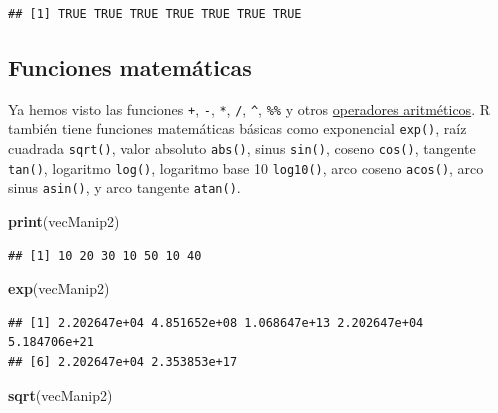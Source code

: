 \documentclass[]{book}
\newenvironment{Shaded}{\begin{snugshade}}{\end{snugshade}}
\newcommand{\KeywordTok}[1]{\textcolor[rgb]{0.13,0.29,0.53}{\textbf{#1}}}
\newcommand{\StringTok}[1]{\textcolor[rgb]{0.31,0.60,0.02}{#1}}
\newcommand{\OperatorTok}[1]{\textcolor[rgb]{0.81,0.36,0.00}{\textbf{#1}}}
\newcommand{\NormalTok}[1]{#1}
\begin{document}
\begin{Shaded}
\end{Shaded}

\begin{verbatim}
## [1] TRUE TRUE TRUE TRUE TRUE TRUE TRUE
\end{verbatim}

\subsection{Funciones matemáticas}\label{l015maths}

Ya hemos visto las funciones \texttt{+}, \texttt{-}, \texttt{*},
\texttt{/}, \texttt{\^{}}, \texttt{\%\%} y otros
\protect\hyperlink{l011opari}{operadores aritméticos}. R también tiene
funciones matemáticas básicas como exponencial \texttt{exp()}, raíz
cuadrada \texttt{sqrt()}, valor absoluto \texttt{abs()}, sinus
\texttt{sin()}, coseno \texttt{cos()}, tangente \texttt{tan()},
logaritmo \texttt{log()}, logaritmo base 10 \texttt{log10()}, arco
coseno \texttt{acos()}, arco sinus \texttt{asin()}, y arco tangente
\texttt{atan()}.

\begin{Shaded}
\begin{Highlighting}[]
\KeywordTok{print}\NormalTok{(vecManip2)}
\end{Highlighting}
\end{Shaded}

\begin{verbatim}
## [1] 10 20 30 10 50 10 40
\end{verbatim}

\begin{Shaded}
\begin{Highlighting}[]
\KeywordTok{exp}\NormalTok{(vecManip2)}
\end{Highlighting}
\end{Shaded}

\begin{verbatim}
## [1] 2.202647e+04 4.851652e+08 1.068647e+13 2.202647e+04 5.184706e+21
## [6] 2.202647e+04 2.353853e+17
\end{verbatim}

\begin{Shaded}
\begin{Highlighting}[]
\KeywordTok{sqrt}\NormalTok{(vecManip2)}
\end{Highlighting}
\end{Shaded}
\end{document}
